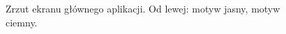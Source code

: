 \documentclass{SGGW-thesis}
\begin{document}
\begin{figure}
  \caption[Ekran główny]{
    \label{screen.glowny}
    Zrzut ekranu głównego aplikacji. Od lewej: motyw jasny, motyw ciemny. \vspace{2ex}
  }
\end{figure}



\beforelastpage
\end{document}
